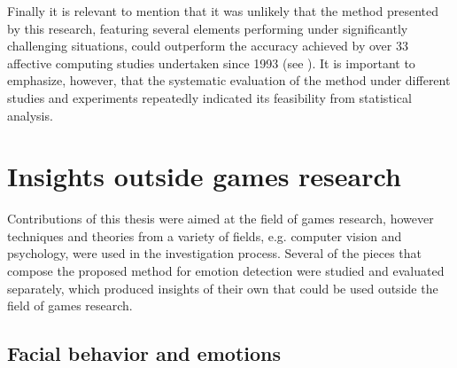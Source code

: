 Finally it is relevant to mention that it was unlikely that the method presented by this research, featuring several elements performing under significantly challenging situations, could outperform the accuracy achieved by over 33 affective computing studies undertaken since 1993 (see \textcite{moghimi2017affective}). It is important to emphasize, however, that the systematic evaluation of the method under different studies and experiments repeatedly indicated its feasibility from statistical analysis.





\section{Insights outside games research}

Contributions of this thesis were aimed at the field of games research, however techniques and theories from a variety of fields, e.g. computer vision and psychology, were used in the investigation process. Several of the pieces that compose the proposed method for emotion detection were studied and evaluated separately, which produced insights of their own that could be used outside the field of games research.

\subsection{Facial behavior and emotions}

